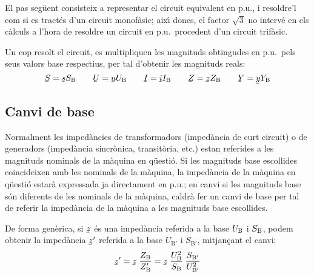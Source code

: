 El pas seg\"{u}ent consisteix a representar el circuit equivalent en
p.u., i resoldre'l com si es tract\'{e}s d'un circuit monof\`{a}sic; aix\'{\i}
doncs, el factor $\sqrt{3}$ no interv\'{e} en els c\`{a}lculs a l'hora de
resoldre un circuit en p.u.\ procedent d'un circuit trif\`{a}sic.

Un cop resolt el circuit, es multipliquen les magnituds obtingudes en p.u.\ pels
seus valors base respectius, per tal d'obtenir les magnituds reals:
\begin{equation}
   \cmplx{S} = \cmplx{s} S\ped{B} \qquad \cmplx{U} = \cmplx{u} U\ped{B} \qquad \cmplx{I} = \cmplx{i} I\ped{B} \qquad \cmplx{Z} = \cmplx{z} Z\ped{B} \qquad \cmplx{Y} = \cmplx{y} Y\ped{B}
\end{equation}

\subsection{Canvi de base} 

Normalment les imped\`{a}ncies de transformadors (imped\`{a}ncia de curt circuit) o de generadors (imped\`{a}ncia sincr\`{o}nica, transit\`{o}ria, etc.) estan referides a les magnituds nominals de la m\`{a}quina en q\"{u}esti\'{o}. Si les magnituds base escollides coincideixen amb les nominals de la m\`{a}quina, la imped\`{a}ncia de la m\`{a}quina en q\"{u}esti\'{o} estar\`{a} expressada ja directament en p.u.; en canvi si les magnituds base s\'{o}n diferents de les nominals de la m\`{a}quina, caldr\`{a} fer un canvi de base per tal de referir la imped\`{a}ncia de la m\`{a}quina a les magnituds base escollides.

De forma gen\`{e}rica, si $\cmplx{z}$ \'{e}s una imped\`{a}ncia referida a la base $U_\mathrm{B}$ i $S_\mathrm{B}$, podem obtenir la imped\`{a}ncia $\cmplx{z}'$ referida a la base $U_{\text{B}'}$ i $S_{\text{B}'}$, mitjan\c{c}ant el canvi:
\begin{equation}
   \cmplx{z}' = \cmplx{z} \; \frac{Z\ped{B}}{Z\ped{B}'} = \cmplx{z} \; \frac{U\ped{B}^2}{S\ped{B}} \; \frac{S_{\text{B}'}}{U_{\text{B}'}^2}
\end{equation}

